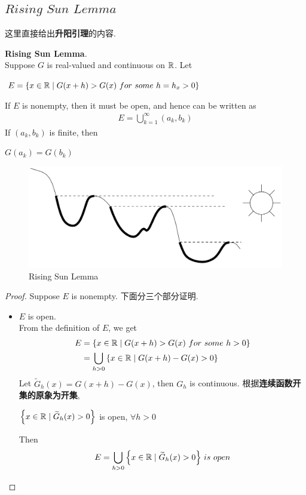\subsection{$Rising \,\, Sun \,\, Lemma$}
	这里直接给出\textbf{升阳引理}的内容.
	\begin{lemma}\label{lemma 4.5.1}
		\textbf{Rising Sun Lemma}. \\
		Suppose $G$ is real-valued and continuous on $\mathbb{R}$. Let
		\begin{center}
			$E = \left\{ x \in \mathbb{R} \mid G(x + h) > G(x) \,\, for \,\, some \,\, h = h_x > 0 \right\}$
		\end{center}
		If $E$ is nonempty, then it must be open, and hence can be written as
		\begin{align}
			E = \bigcup_{k = 1}^{\infty}{(a_k , b_k)}
		\end{align}
		If $(a_k , b_k)$ is finite, then
		\begin{center}
			$G(a_k) = G(b_k)$
		\end{center}
		
		\begin{figure}[thbp!]
			\centering
			\includegraphics[width=0.7\linewidth]{figure/4.5.1-1}
			\caption{Rising Sun Lemma}
			\label{pic : 4.5.1-1} %
		\end{figure}
	
		\newpage
		\begin{proof}
			Suppose $E$ is nonempty. 下面分三个部分证明.
			\begin{itemize}
				\item $E$ is open. \\
				From the definition of $E$, we get
				\begin{align}
					E &= \left\{ x \in \mathbb{R} \mid G(x + h) > G(x) \,\, for \,\, some \,\, h > 0 \right\} \\
					&= \bigcup_{h > 0}{\left\{ x \in \mathbb{R} \mid G(x + h) - G(x) > 0 \right\}}
				\end{align}
				Let $\widetilde{G}_{h}(x) = G(x + h) - G(x)$, then $G_h$ is continuous. 根据\textbf{连续函数开集的原象为开集},
				\begin{center}
					$\left\{ x \in \mathbb{R} \mid \widetilde{G}_{h}(x) > 0 \right\}$ is open, $\forall h > 0$
				\end{center}
				Then
				\begin{align}
					E = \bigcup_{h > 0}{\left\{ x \in \mathbb{R} \mid \widetilde{G}_{h}(x) > 0 \right\}} \,\, is \,\, open
				\end{align}
			

\end{itemize}
\end{proof}
\end{lemma}
